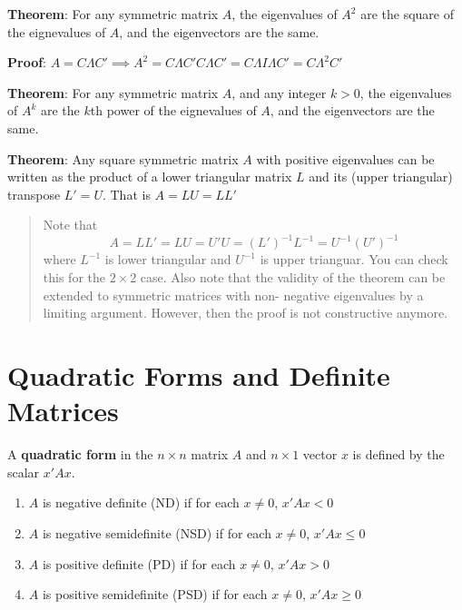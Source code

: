 \documentclass[12pt,]{book}
\providecommand{\tightlist}{%
  \setlength{\itemsep}{0pt}\setlength{\parskip}{0pt}}
\begin{document}
\textbf{Theorem}:
For any symmetric matrix \(A\), the eigenvalues of \(A^2\) are the square of the eignevalues of \(A\), and the eigenvectors are the same.

\textbf{Proof}:
\(A = C \Lambda C' \implies A^2 = C \Lambda C' C \Lambda C' = C \Lambda I \Lambda C' = C \Lambda^2 C'\)
\[\tag*{$\blacksquare$}\]

\textbf{Theorem}: For any symmetric matrix \(A\), and any integer \(k>0\), the eigenvalues of \(A^k\) are the \(k\)th power of the eignevalues of \(A\), and the eigenvectors are the same.

\textbf{Theorem}:
Any square symmetric matrix \(A\) with positive eigenvalues can be written as the product of a lower triangular matrix \(L\) and its (upper triangular) transpose \(L' = U\). That is \(A = LU = LL'\)

\begin{quote}
Note that
\[
A = LL' = LU = U'U  = (L')^{-1}L^{-1} = U^{-1}(U')^{-1}
\]
where \(L^{-1}\) is lower triangular and \(U^{ -1}\) is upper trianguar. You can check this for the \(2 \times 2\) case. Also note that the validity of the theorem can be extended to symmetric matrices with non- negative eigenvalues by a limiting argument. However, then the proof is not constructive anymore.
\end{quote}

\hypertarget{quadratic-forms-and-definite-matrices}{%
\section{Quadratic Forms and Definite Matrices}\label{quadratic-forms-and-definite-matrices}}

A \textbf{quadratic form} in the \(n \times n\) matrix \(A\) and \(n \times 1\) vector \(x\) is defined by the scalar \(x'Ax\).

\begin{enumerate}
\def\labelenumi{\arabic{enumi}.}
\tightlist
\item
  \(A\) is negative definite (ND) if for each \(x \neq 0\), \(x'Ax < 0\)
\item
  \(A\) is negative semidefinite (NSD) if for each \(x \neq 0\), \(x'Ax \leq 0\)
\item
  \(A\) is positive definite (PD) if for each \(x \neq 0\), \(x'Ax > 0\)
\item
  \(A\) is positive semidefinite (PSD) if for each \(x \neq 0\), \(x'Ax \geq 0\)
\end{enumerate}
\end{document}
